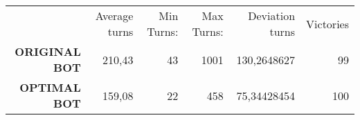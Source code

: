 \begin{tabular}{rrrrrr}

           & Average turns & Min Turns: & Max Turns: & Deviation turns &  Victories \\

{\bf ORIGINAL BOT} &     210,43 &         43 &       1001 & 130,2648627 &         99 \\

{\bf OPTIMAL BOT} &     159,08 &         22 &        458 & 75,34428454 &        100 \\

\end{tabular}  
